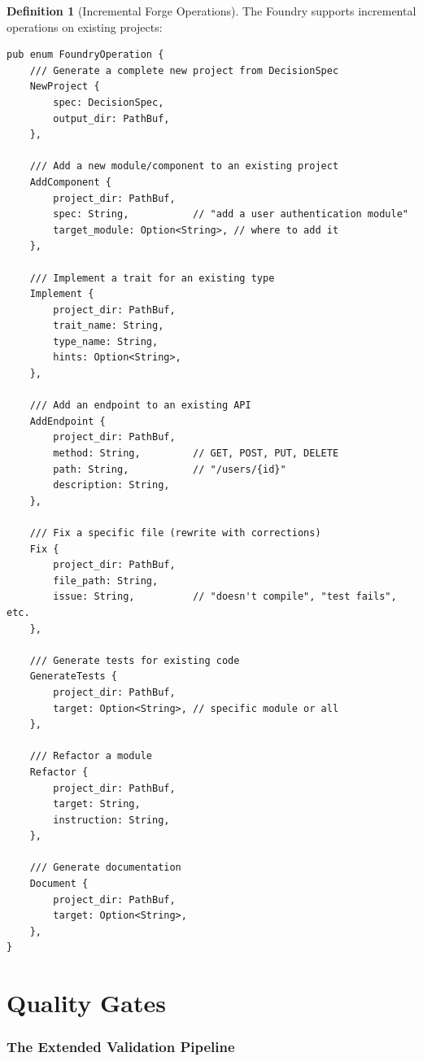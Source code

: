 \documentclass[11pt,a4paper,twoside]{article}
\theoremstyle{definition}
\newtheorem{definition}{Definition}[section]
\theoremstyle{plain}
\theoremstyle{remark}
\begin{document}
\begin{definition}[Incremental Forge Operations]\label{def:incremental}
The Foundry supports incremental operations on existing projects:
\begin{lstlisting}
pub enum FoundryOperation {
    /// Generate a complete new project from DecisionSpec
    NewProject {
        spec: DecisionSpec,
        output_dir: PathBuf,
    },

    /// Add a new module/component to an existing project
    AddComponent {
        project_dir: PathBuf,
        spec: String,           // "add a user authentication module"
        target_module: Option<String>, // where to add it
    },

    /// Implement a trait for an existing type
    Implement {
        project_dir: PathBuf,
        trait_name: String,
        type_name: String,
        hints: Option<String>,
    },

    /// Add an endpoint to an existing API
    AddEndpoint {
        project_dir: PathBuf,
        method: String,         // GET, POST, PUT, DELETE
        path: String,           // "/users/{id}"
        description: String,
    },

    /// Fix a specific file (rewrite with corrections)
    Fix {
        project_dir: PathBuf,
        file_path: String,
        issue: String,          // "doesn't compile", "test fails", etc.
    },

    /// Generate tests for existing code
    GenerateTests {
        project_dir: PathBuf,
        target: Option<String>, // specific module or all
    },

    /// Refactor a module
    Refactor {
        project_dir: PathBuf,
        target: String,
        instruction: String,
    },

    /// Generate documentation
    Document {
        project_dir: PathBuf,
        target: Option<String>,
    },
}
\end{lstlisting}
\end{definition}


\part{Quality Gates}\label{part:gates}

\section{The Extended Validation Pipeline}\label{sec:extval}
\end{document}
